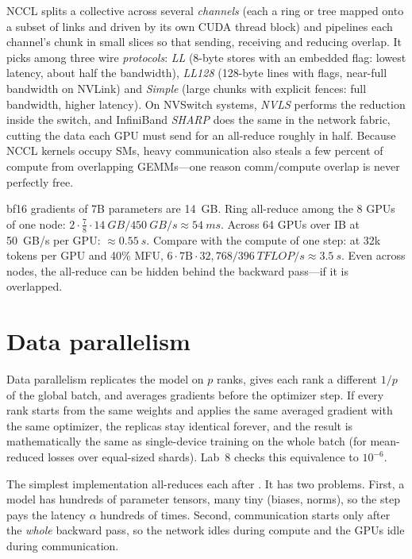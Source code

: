 \begin{deepdive}
NCCL splits a collective across several \emph{channels} (each a ring or tree mapped onto a
subset of links and driven by its own CUDA thread block) and pipelines each channel's chunk in
small slices so that sending, receiving and reducing overlap. It picks among three wire
\emph{protocols}: \emph{LL} (8-byte stores with an embedded flag: lowest latency, about half the
bandwidth), \emph{LL128} (128-byte lines with flags, near-full bandwidth on NVLink) and
\emph{Simple} (large chunks with explicit fences: full bandwidth, higher latency). On NVSwitch
systems, \emph{NVLS} performs the reduction inside the switch, and InfiniBand \emph{SHARP} does
the same in the network fabric, cutting the data each GPU must send for an all-reduce roughly in
half. Because NCCL kernels occupy SMs, heavy communication also steals a few percent of compute
from overlapping GEMMs---one reason comm/compute overlap is never perfectly free.
\end{deepdive}

\begin{napkinmath}
bf16 gradients of 7B parameters are \SI{14}{GB}. Ring all-reduce among the 8 GPUs of one node:
$2\cdot\frac78\cdot\SI{14}{GB}/\SI{450}{GB/s}\approx\SI{54}{ms}$. Across 64 GPUs over IB at
\SI{50}{GB/s} per GPU: $\approx\SI{0.55}{s}$. Compare with the compute of one step: at 32k
tokens per GPU and 40\% MFU, $6\cdot7\text{B}\cdot32{,}768/\SI{396}{TFLOP/s}\approx\SI{3.5}{s}$.
Even across nodes, the all-reduce can be hidden behind the backward pass---if it is overlapped.
\end{napkinmath}

\section{Data parallelism}\label{sec:dist:dp}

Data parallelism replicates the model on $p$ ranks, gives each rank a different $1/p$ of the
global batch, and averages gradients before the optimizer step. If every rank starts from the
same weights and applies the same averaged gradient with the same optimizer, the replicas stay
identical forever, and the result is mathematically the same as single-device training on the
whole batch (for mean-reduced losses over equal-sized shards). Lab~8 checks this equivalence
to $10^{-6}$.

The simplest implementation all-reduces each  after . It has two
problems. First, a model has hundreds of parameter tensors, many tiny (biases, norms), so the
step pays the latency $\alpha$ hundreds of times. Second, communication starts only after the
\emph{whole} backward pass, so the network idles during compute and the GPUs idle during
communication.

